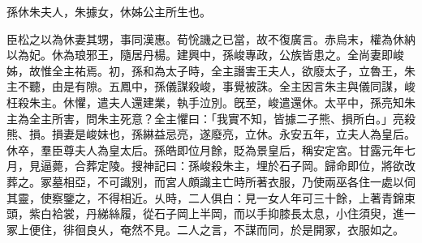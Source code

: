 
\begin{pinyinscope}
孫休朱夫人，朱據女，休姊公主所生也。

臣松之以為休妻其甥，事同漢惠。荀恱譏之已當，故不復廣言。赤烏末，權為休納以為妃。休為琅邪王，隨居丹楊。建興中，孫峻專政，公族皆患之。全尚妻即峻姊，故惟全主祐焉。初，孫和為太子時，全主譖害王夫人，欲廢太子，立魯王，朱主不聽，由是有隙。五鳳中，孫儀謀殺峻，事覺被誅。全主因言朱主與儀同謀，峻枉殺朱主。休懼，遣夫人還建業，執手泣別。旣至，峻遣還休。太平中，孫亮知朱主為全主所害，問朱主死意？全主懼曰：「我實不知，皆據二子熊、損所白。」亮殺熊、損。損妻是峻妹也，孫綝益忌亮，遂廢亮，立休。永安五年，立夫人為皇后。休卒，羣臣尊夫人為皇太后。孫皓即位月餘，貶為景皇后，稱安定宮。甘露元年七月，見逼薨，合葬定陵。搜神記曰：孫峻殺朱主，埋於石子岡。歸命即位，將欲改葬之。冢墓相亞，不可識別，而宮人頗識主亡時所著衣服，乃使兩巫各住一處以伺其靈，使察鑒之，不得相近。乆時，二人俱白：見一女人年可三十餘，上著青錦束頭，紫白袷裳，丹綈絲履，從石子岡上半岡，而以手抑膝長太息，小住須臾，進一冢上便住，徘徊良乆，奄然不見。二人之言，不謀而同，於是開冢，衣服如之。


\end{pinyinscope}